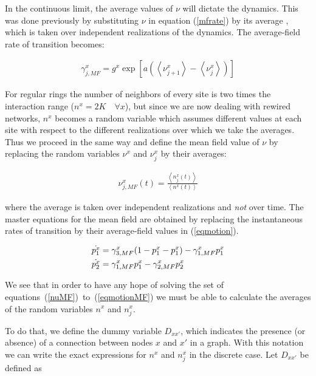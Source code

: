 In the continuous limit, the average values of $\nu$ will dictate the dynamics. This was done previously by substituting $\nu$ in
equation (\ref{mfrate}) by its average \cite{escaff2014arrays}, which is taken over independent realizations of the dynamics. The
average-field rate of transition becomes:

\begin{align}
    \gamma^x_{j,MF} = g^x \exp \left[ a \left( \left< \nu^x_{j+1} \right> - \left< \nu^x_j \right> \right) \right]
    \label{gammaMF}
\end{align}

For regular rings the number of neighbors of every site is two times the interaction range ($n^x = 2K \quad \forall x$), but since we
are now dealing with rewired networks, $n^x$ becomes a random variable which assumes different values at each site with respect to the
different realizations over which we take the averages. Thus we proceed in the same way and define the mean field value of $\nu$ by
replacing the random variables $\nu^x$ and $\nu^x_j$ by their averages:

\begin{align}
    \nu^x_{j,MF}(t) = \frac{\left< n^x_j(t) \right>}{\left< n^x(t) \right>}
    \label{nuMF}
\end{align}

\noindent where the average is taken over independent realizations and \textit{not} over time. The master equations for the mean field
are obtained by replacing the instantaneous rates of transition by their average-field values in (\ref{eqmotion}).

\begin{align}
    \dot{p^x_1} &= \gamma^x_{3,MF} (1-p^x_1-p^x_1) - \gamma^x_{1,MF} p^x_1 \notag \\
    \dot{p^x_2} &= \gamma^x_{1,MF}  p^x_1 - \gamma^x_{2,MF} p^x_2
    \label{eqmotionMF}
\end{align}

We see that in order to have any hope of solving the set of equations~(\ref{nuMF})~to~(\ref{eqmotionMF}) we must be able to calculate
the averages of the random variables $n^x$ and $n^x_j$.

To do that, we define the dummy variable $D_{xx'}$, which indicates the presence (or absence) of a connection between nodes $x$ and
$x'$ in a graph. With this notation we can write the exact expressions for $n^x$ and $n^x_j$ in the discrete case. Let $D_{xx'}$ be
defined as

